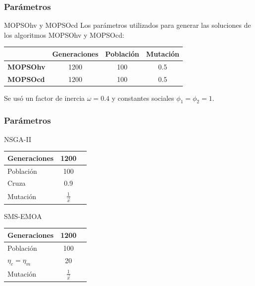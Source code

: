 \documentclass[10pt,compress]{beamer}
\begin{document}
\begin{frame}
	\frametitle{Par\'ametros }
	\begin{block}{MOPSOhv y MOPSOcd}
	Los par\'ametros utilizados para generar las soluciones de los algoritmos MOPSOhv y MOPSOcd:
	
	\begin{table}[H]
  \begin{center}
    \begin{tabular}{|l||c|c|c|}
	\hline
	& \textbf{Generaciones}  & \textbf{Poblaci\'on} & \textbf{Mutaci\'on} \\
	\hline
	\hline
	\textbf{MOPSOhv} & 1200 & 100 &0.5\\ 
	\hline
	\textbf{MOPSOcd} & 1200 & 100 &0.5\\
	\hline
	\end{tabular}
  \end{center}		
	
\end{table}
Se us\'o un factor de inercia $\omega = 0.4$ y constantes sociales $\phi_{1}=\phi_{2}=1$.
 \end{block}
\end{frame}

\begin{frame}
	\frametitle{Par\'ametros}
		\begin{block}{NSGA-II}
		\begin{table}[H]
  \begin{center}
    \begin{tabular}{|l||c|c}
	\hline
	Generaciones  & 1200 \\ 
	\hline
	Poblaci\'on & 100 \\ 
	\hline
	Cruza & 0.9 \\
	\hline
	Mutaci\'on & $\frac{1}{\vec{x}}$ \\
	\hline
  \end{tabular}

\end{center}
\end{table}
		\end{block}
		
		\begin{block}{SMS-EMOA}
		\begin{table}[H]
	\begin{center}
		\begin{tabular}{|l||c|c}
			\hline
			Generaciones  & 1200 \\ 
			\hline
			Poblaci\'on & 100 \\ 
			\hline
			$\eta_c = \eta_m$ & 20 \\ 
			\hline
			Mutaci\'on & $\frac{1}{\vec{x}}$\\ 
			\hline			
		\end{tabular}
	\end{center}
\end{table}
		\end{block}
\end{frame}
\end{document}
